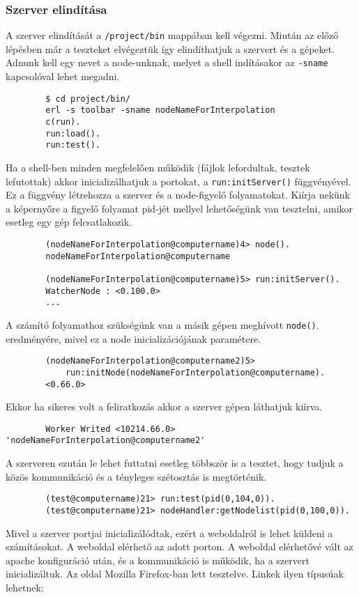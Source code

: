 \subsubsection{Szerver elindítása}
	A szerver elindítását a \texttt{/project/bin} mappában kell végezni. Miután az előző lépésben már a teszteket elvégeztük így elindíthatjuk a szervert és a gépeket.
	Adnunk kell egy nevet a node-unknak, melyet a shell indításakor az \texttt{-sname} kapcsolóval lehet megadni.
	\begin{verbatim}
		$ cd project/bin/
		erl -s toolbar -sname nodeNameForInterpolation
		c(run).
		run:load().
		run:test().
	\end{verbatim}
	Ha a shell-ben minden megfelelően működik (fájlok lefordultak, tesztek lefutottak) akkor inicializálhatjuk a portokat, a \texttt{run:initServer()} függvényével. Ez a függvény létrehozza a szerver és a node-figyelő folyamatokat. Kiírja nekünk a képernyőre a figyelő folyamat pid-jét mellyel lehetőségünk van tesztelni, amikor esetleg egy gép felcsatlakozik. 
	\begin{verbatim}
		(nodeNameForInterpolation@computername)4> node().
		nodeNameForInterpolation@computername

		(nodeNameForInterpolation@computername)5> run:initServer().
		WatcherNode : <0.100.0>
		...
	\end{verbatim}
	A számító folyamathoz szükségünk van a másik gépen meghívott \texttt{node()}. eredményére, mivel ez a node inicializációjának paramétere. 
	\begin{verbatim}
		(nodeNameForInterpolation@computername2)5> 
		    run:initNode(nodeNameForInterpolation@computername).
		<0.66.0>
	\end{verbatim}
	Ekkor ha sikeres volt a feliratkozás akkor a szerver gépen láthatjuk kiírva.
	\begin{verbatim}
		Worker Writed <10214.66.0> 'nodeNameForInterpolation@computername2'
	\end{verbatim}
	A szerveren ezután le lehet futtatni esetleg többször is a tesztet, hogy tudjuk a közös kommunikáció és a tényleges szétosztás is megtörténik.
	\begin{verbatim}
		(test@computername)21> run:test(pid(0,104,0)).
		(test@computername)21> nodeHandler:getNodelist(pid(0,100,0)).
	\end{verbatim}
	Mivel a szerver portjai inicializálódtak, ezért a weboldalról is lehet küldeni a számításokat. 
	A weboldal elérhető az adott porton. A weboldal elérhetővé vált az apache konfiguráció után, és a kommunikáció is működik, ha a szervert inicializáltuk. Az oldal Mozilla Firefox-ban lett tesztelve. Linkek ilyen típusúak lehetnek: 

